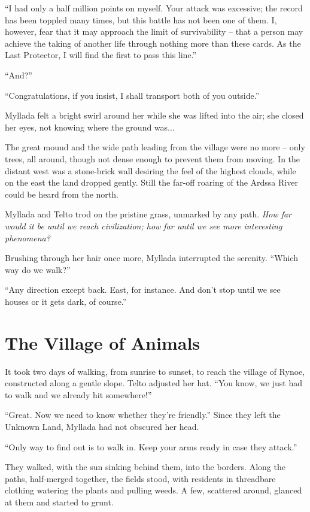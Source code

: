 ``I had only a half million points on myself. Your attack was excessive; the record has been toppled many times, but this battle has not been one of them. I, however, fear that it may approach the limit of survivability -- that a person may achieve the taking of another life through nothing more than these cards. As the Last Protector, I will find the first to pass this line.''

``And?''

``Congratulations, if you insist, I shall transport both of you outside.''

Myllada felt a bright swirl around her while she was lifted into the air; she closed her eyes, not knowing where the ground was...

\centeredstars

The great mound and the wide path leading from the village were no more -- only trees, all around, though not dense enough to prevent them from moving. In the distant west was a stone-brick wall desiring the feel of the highest clouds, while on the east the land dropped gently. Still the far-off roaring of the Ardssa River could be heard from the north.

Myllada and Telto trod on the pristine grass, unmarked by any path. \emph{How far would it be until we reach civilization; how far until we see more interesting phenomena?}

Brushing through her hair once more, Myllada interrupted the serenity. ``Which way do we walk?''

``Any direction except back. East, for instance. And don't stop until we see houses or it gets dark, of course.''

\chapter{The Village of Animals}

It took two days of walking, from sunrise to sunset, to reach the village of Rynoe, constructed along a gentle slope. Telto adjusted her hat. ``You know, we just had to walk and we already hit somewhere!''

``Great. Now we need to know whether they're friendly.'' Since they left the Unknown Land, Myllada had not obscured her head.

``Only way to find out is to walk in. Keep your arms ready in case they attack.''

They walked, with the sun sinking behind them, into the borders. Along the paths, half-merged together, the fields stood, with residents in threadbare clothing watering the plants and pulling weeds. A few, scattered around, glanced at them and started to grunt.

